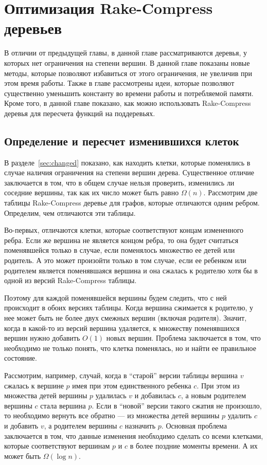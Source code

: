 \chapter{Оптимизация Rake-Compress деревьев}

В отличии от предыдущей главы, в данной главе рассматриваются деревья, у которых нет ограничения на степени вершин. 
В данной главе показаны новые методы, которые позволяют избавиться от этого ограничения, не увеличив при этом время работы.
Также в главе рассмотрены идеи, которые позволяют существенно уменьшить константу во времени работы и потребляемой памяти.
Кроме того, в данной главе показано, как можно использовать Rake-Compress деревья для пересчета функций на поддеревьях.

\FloatBarrier
\section{Определение и пересчет изменившихся клеток}
В разделе~\ref{sec:changed} показано, как находить клетки, которые поменялись в случае наличия ограничения на степени вершин дерева.
Существенное отличие заключается в том, что в общем случае нельзя проверить, изменились ли соседние вершины, так как их число может быть равно $\Omega(n)$.
Рассмотрим две таблицы Rake-Compress деревье для графов, которые отличаются одним ребром. Определим, чем отличаются эти таблицы.

Во-первых, отличаются клетки, которые соответствуют концам измененного ребра. 
Если же вершина не является концом ребра, то она будет считаться поменявшейся только в случае, если поменялось множество ее детей или родитель. 
А это может произойти только в том случае, если ее ребенком или родителем является поменявшаяся вершина и она сжалась к родителю хотя бы в одной из версий Rake-Compress таблицы.

Поэтому для каждой поменявшейся вершины будем следить, что с ней происходит в обоих версиях таблицы. 
Когда вершина сжимается к родителю, у нее может быть не более двух смежных вершин (включая родителя).
Значит, когда в какой-то из версий вершина удаляется, к множеству поменявшихся вершин нужно добавить $O(1)$ новых вершин.
Проблема заключается в том, что необходимо не только понять, что клетка поменялась, но и найти ее правильное состояние. 

Рассмотрим, например, случай, когда в ``старой'' версии таблицы вершина $v$ сжалась к вершине $p$ имея при этом единственного ребенка $c$. 
При этом из множества детей вершины $p$ удалилась $v$ и добавилась $c$, а новым родителем вершины $c$ стала вершина $p$. 
Если в ``новой'' версии такого сжатия не произошло, то необходимо вернуть все обратно --- из множества детей вершины $p$ удалить $c$ и добавить $v$, а родителем вершины $c$ назначить $p$.
Основная проблема заключается в том, что данные изменения необходимо сделать со всеми клетками, которые соответствуют вершинам $p$ и $c$ в более поздние моменты времени. А их может быть $\Omega(\log n)$.

